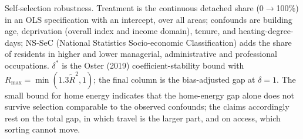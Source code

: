 \documentclass[pdflatex,sn-nature]{sn-jnl}
\begin{document}
\begin{table}[p]
\caption{Self-selection robustness. Treatment is the continuous detached share (0$\to$100\%) in an OLS specification with an intercept, over all areas; confounds are building age, deprivation (overall index and income domain), tenure, and heating-degree-days; NS-SeC (National Statistics Socio-economic Classification) adds the share of residents in higher and lower managerial, administrative and professional occupations. $\delta^{*}$ is the Oster (2019) coefficient-stability bound with $R_{\max} = \min(1.3\tilde{R}^{2}, 1)$; the final column is the bias-adjusted gap at $\delta = 1$. The small bound for home energy indicates that the home-energy gap alone does not survive selection comparable to the observed confounds; the claims accordingly rest on the total gap, in which travel is the larger part, and on access, which sorting cannot move.}
\label{edtab:oster}

\end{table}
\end{document}
